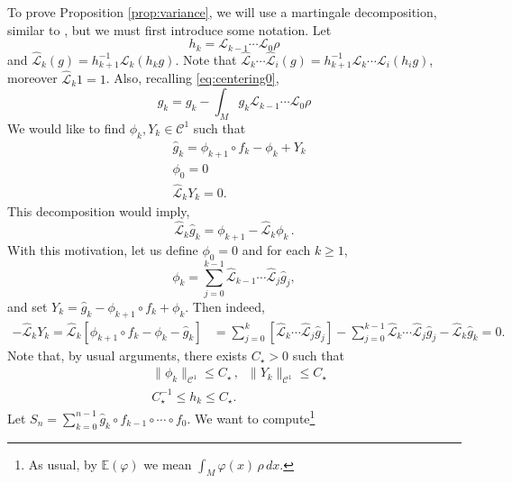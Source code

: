 \documentclass{amsart}
\numberwithin{equation}{section}
\newcommand\cC{{\mathcal C}}
\newcommand\cL{{\mathcal L}}
\newcommand\bE{{\mathbb E}}
\newcommand\vf{\varphi}
\newcommand{\wcL}{\widehat \cL}
\begin{document}
To prove Proposition \ref{prop:variance}, we will use a martingale decomposition, 
similar to \cite{DH24}, but we must first introduce some notation.
Let
\begin{equation}\label{eq:hdef}
h_k=\cL_{k-1}\cdots\cL_0 \rho
\end{equation}
and $\widehat \cL_k(g)=h_{k+1}^{-1}\cL_k (h_k g)$. Note that $\widehat \cL_k\cdots\widehat\cL_i(g)=h_{k+1}^{-1}\cL_k\cdots\cL_i(h_i g)$, moreover $\widehat\cL_k 1=1$. Also, recalling \eqref{eq:centering0},
\begin{equation}\label{eq:centering1}
\hat g_k=g_k-\int_{M} g_k \cL_{k-1}\cdots \cL_0 \rho 
\end{equation}
We would like to find $\phi_k, Y_k\in \cC^1$ such that
\begin{equation}\label{eq:coboundary0}
\begin{split}
&\hat g_k=\phi_{k+1}\circ f_k-\phi_k+Y_k\\
&\phi_0=0\\
&\widehat \cL_k Y_k=0.
\end{split}
\end{equation}
This decomposition would imply,
\[
\wcL_k \hat g_k=\phi_{k+1}-\wcL_k\phi_k \, .
\]
With this motivation, let us define $\phi_0 =0$ and for each $k \ge 1$,
\begin{equation}\label{eq:coboundary}
\phi_k=\sum_{j=0}^{k-1}\wcL_{k-1}\cdots \wcL_j \hat g_j,
\end{equation}
and set $Y_k = \hat g_k - \phi_{k+1} \circ f_k + \phi_k$.  Then indeed,
\[
\begin{split}
-  \wcL_k Y_k=\wcL_k\left[\phi_{k+1}\circ f_k-\phi_k-\hat g_k\right]&=\sum_{j=0}^{k}\left[\wcL_{k}\cdots\wcL_j \hat g_j \right]-\sum_{j=0}^{k-1}\wcL_{k}\cdots\wcL_j \hat g_j -\wcL_k \hat g_k=0.
\end{split}
\]
Note that, by usual arguments, there exists $C_\star>0$ such that
\begin{equation}\label{eq:standard_bound}
\begin{split}
&\|\phi_k\|_{\cC^1}\leq C_\star\,,\;\;\|Y_k\|_{\cC^1}\leq C_\star\\
& C_\star^{-1} \leq h_k \leq C_\star.
\end{split}
\end{equation}
Let $S_n=\sum_{k=0}^{n-1}\hat g_k\circ f_{k-1}\circ \cdots\circ f_0$. We want to compute\footnote{ As usual, by $\bE(\vf)$ we mean $\int_M\vf(x) \, \rho \, dx$.}
\end{document}
